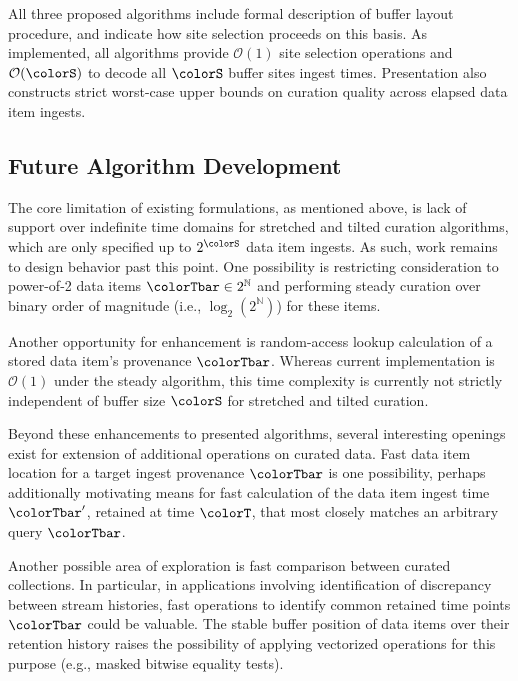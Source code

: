 All three proposed algorithms include formal description of buffer layout procedure, and indicate how site selection proceeds on this basis.
As implemented, all algorithms provide $\mathcal{O}(1)$ site selection operations and $\mathcal{O}(\colorS)$ to decode all $\colorS$ buffer sites ingest times.
Presentation also constructs strict worst-case upper bounds on curation quality across elapsed data item ingests.

\subsection{Future Algorithm Development}

The core limitation of existing formulations, as mentioned above, is lack of support over indefinite time domains for stretched and tilted curation algorithms, which are only specified up to $2^{\colorS}$ data item ingests.
As such, work remains to design behavior past this point.
One possibility is restricting consideration to power-of-2 data items $\colorTbar \in 2^{\mathbb{N}}$ and performing steady curation over binary order of magnitude (i.e., $\log_2(2^{\mathbb{N}})$) for these items.

Another opportunity for enhancement is random-access lookup calculation of a stored data item's provenance $\colorTbar$.
Whereas current implementation is $\mathcal{O}(1)$ under the steady algorithm, this time complexity is currently not strictly independent of buffer size $\colorS$ for stretched and tilted curation.

Beyond these enhancements to presented algorithms, several interesting openings exist for extension of additional operations on curated data.
Fast data item location for a target ingest provenance $\colorTbar$ is one possibility, perhaps additionally motivating means for fast calculation of the data item ingest time $\colorTbar'$, retained at time $\colorT$, that most closely matches an arbitrary query $\colorTbar$.

Another possible area of exploration is fast comparison between curated collections.
In particular, in applications involving identification of discrepancy between stream histories, fast operations to identify common retained time points $\colorTbar$ could be valuable.
The stable buffer position of data items over their retention history raises the possibility of applying vectorized operations for this purpose (e.g., masked bitwise equality tests).


